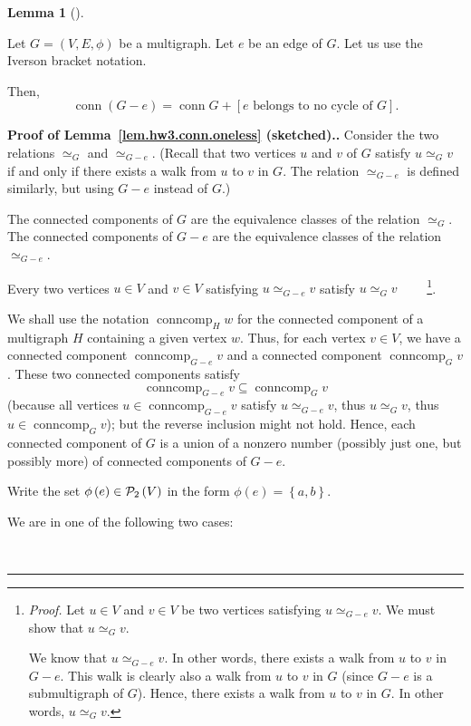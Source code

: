 \documentclass[numbers=enddot,12pt,final,onecolumn,notitlepage]{scrartcl}%
\theoremstyle{definition}
\newtheorem{lem}[theo]{Lemma}
\newenvironment{lemma}[1][]
{\begin{lem}[#1]\begin{leftbar}}
{\end{leftbar}\end{lem}}
\newenvironment{proof}[1][Proof]{\noindent\textbf{#1.} }{\ \rule{0.5em}{0.5em}}
\newcommand{\conncomp}{\operatorname{conncomp}}
\newcommand{\conn}{\operatorname{conn}}
\newcommand{\powset}[2][]{\ifthenelse{\equal{#2}{}}{\mathcal{P}\left(#1\right)}{\mathcal{P}_{#1}\left(#2\right)}}
\newcommand{\set}[1]{\left\{ #1 \right\}}
\newcommand{\tup}[1]{\left( #1 \right)}
\newcommand{\ive}[1]{\left[ #1 \right]}
\begin{document}
\begin{lemma} \label{lem.hw3.conn.oneless}
Let $G = \tup{V, E, \phi}$ be a multigraph.
Let $e$ be an edge of $G$.
Let us use the Iverson bracket notation.

Then,
\[
\conn \tup{G - e}
= \conn G
    + \ive{e \text{ belongs to no cycle of } G} .
\]
\end{lemma}

\begin{proof}[Proof of Lemma~\ref{lem.hw3.conn.oneless} (sketched).]
Consider the two relations $\simeq_G$ and $\simeq_{G - e}$.
(Recall that two vertices $u$ and $v$ of $G$ satisfy $u \simeq_G v$
if and only if there exists a walk from $u$ to $v$ in $G$.
The relation $\simeq_{G - e}$ is defined similarly, but using $G - e$
instead of $G$.)

The connected components of $G$ are the equivalence classes of the
relation $\simeq_G$.
The connected components of $G - e$ are the equivalence classes of the
relation $\simeq_{G - e}$.

Every two vertices $u \in V$ and $v \in V$
satisfying $u \simeq_{G - e} v$ satisfy $u \simeq_G v$
\ \ \ \ \footnote{\textit{Proof.} Let $u \in V$ and $v \in V$
        be two vertices satisfying $u \simeq_{G - e} v$.
        We must show that $u \simeq_G v$. \par
        We know that $u \simeq_{G - e} v$.
        In other words, there exists a walk from $u$ to $v$ in
        $G - e$.
        This walk is clearly also a walk from $u$ to $v$ in $G$
        (since $G - e$ is a submultigraph of $G$).
        Hence, there exists a walk from $u$ to $v$ in $G$.
        In other words, $u \simeq_G v$.}.

We shall use the notation $\conncomp_H w$ for the connected component
of a multigraph $H$ containing a given vertex $w$.
Thus, for each vertex $v \in V$, we have a connected component
$\conncomp_{G - e} v$ and a connected component
$\conncomp_G v$.
These two connected components satisfy
\[
\conncomp_{G - e} v \subseteq \conncomp_G v
\]
(because all vertices $u \in \conncomp_{G - e} v$ satisfy
$u \simeq_{G - e} v$, thus $u \simeq_G v$, thus
$u \in \conncomp_G v$); but the reverse inclusion might not hold.
Hence, each connected component of $G$ is a union
of a nonzero number (possibly just one, but possibly more) of
connected components of $G - e$.

Write the set $\phi\tup{e} \in \powset[2]{V}$ in the form
$\phi\tup{e} = \set{a, b}$.

We are in one of the following two cases:


\end{proof}
\end{document}
